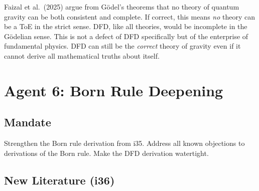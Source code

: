 \documentclass[11pt,a4paper]{article}
\begin{document}
Faizal et al.\ (2025) argue from G\"odel's theorems that no theory of quantum gravity can be both consistent and complete. If correct, this means \emph{no} theory can be a ToE in the strict sense. DFD, like all theories, would be incomplete in the G\"odelian sense. This is not a defect of DFD specifically but of the enterprise of fundamental physics. DFD can still be the \emph{correct} theory of gravity even if it cannot derive all mathematical truths about itself.

\newpage
\section{Agent 6: Born Rule Deepening}
\label{sec:agent6}

\subsection{Mandate}

Strengthen the Born rule derivation from i35. Address all known objections to derivations of the Born rule. Make the DFD derivation watertight.

\subsection{New Literature (i36)}
\end{document}
